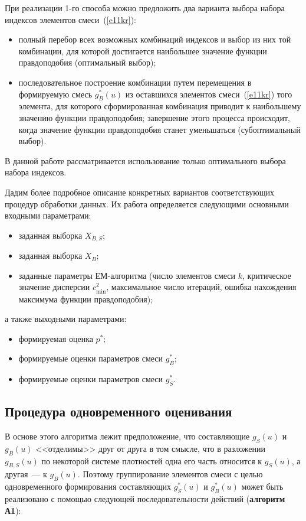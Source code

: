 \begin{multicols}{2}
     При реализации 1-го способа можно предложить два варианта выбора 
набора индексов элементов смеси~(\ref{e11kr}):
     \begin{itemize}
\item полный перебор всех возможных комбинаций индексов и выбор из них той 
комбинации, для которой достигается наибольшее значение функции 
правдоподобия (оптимальный выбор); 
\item последовательное построение комбинации путем перемещения в 
формируемую смесь $g_B^*(u)$ из оставшихся элементов смеси~(\ref{e11kr}) 
того элемента, для которого сформированная комби\-нация приводит к 
наибольшему значению функции правдоподобия; завершение этого процесса 
происходит, когда значение функции правдоподобия станет уменьшаться 
(субоптимальный выбор). 
\end{itemize}
     
     В данной работе рассматривается использование только оптимального 
выбора набора индексов.
     
     Дадим более подробное описание конкретных вариантов соответствующих 
процедур обработки данных. Их работа определяется следующими основными 
входными параметрами: 
     \begin{itemize}
\item заданная выборка $X_{B,S}$;
\item заданная выборка $X_B$;
\item заданные параметры ЕМ-алгоритма (число элементов смеси $k$, 
критическое значение дисперсии $c^2_{\min}$, максимальное число итераций, 
ошибка нахождения максимума функции правдоподобия);
\end{itemize}
а также выходными параметрами:
\begin{itemize}
\item формируемая оценка $p^*$;
\item формируемые оценки параметров смеси $g_B^*$;
\item формируемые оценки параметров смеси $g_S^*$.
\end{itemize}

\subsection{Процедура одновременного оценивания} %
     
     В основе этого алгоритма лежит предположение, что составляющие 
$g_S(u)$ и $g_B(u)$ <<отделимы>> друг от друга в том смысле, что в разложении 
$g_{B,S}(u)$ по некоторой системе плотностей одна его часть относится к 
$g_S(u)$, а другая~--- к $g_B(u)$. Поэтому группирование элементов смеси с 
целью одновременного формирования составляющих $g_S^*(u)$ и $g_B^*(u)$ 
может быть реализовано с помощью следующей последовательности действий
     (\textbf{алгоритм А1}):


\end{multicols}
